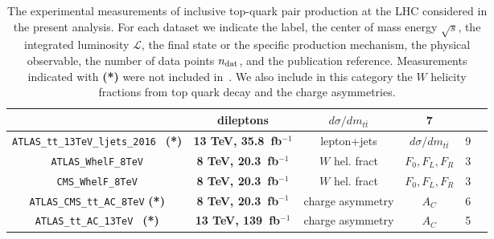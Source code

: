 \begin{table}[t]
\begin{tabular}{c|c|c|c|c|c}
      & dileptons
      & $d\sigma/dm_{t\bar{t}}$
      & 7
      & \cite{Sirunyan:2018ucr}  \\
    \midrule
      {\tt ATLAS\_tt\_13TeV\_ljets\_2016 } {\bf (*)}
      & {\bf 13 TeV, 35.8~fb$^{-1}$}
      & lepton+jets
      & $d\sigma/dm_{t\bar{t}}$
      & 9
      & \cite{Aad:2019ntk}  \\
   \midrule
\midrule
 {\tt ATLAS\_WhelF\_8TeV}  & {\bf 8 TeV, 20.3~fb$^{-1}$}  & $W$ hel. fract &
$F_0, F_L, F_R$  &  3  &  \cite{Aaboud:2016hsq}  \\
\midrule
{\tt CMS\_WhelF\_8TeV}  & {\bf 8 TeV, 20.3~fb$^{-1}$}  & $W$ hel. fract &
$F_0, F_L, F_R$  &  3  &  \cite{Khachatryan:2016fky}  \\
\midrule
\midrule
    {\tt ATLAS\_CMS\_tt\_AC\_8TeV}  {\bf(*)} & {\bf 8 TeV, 20.3~fb$^{-1}$} & charge asymmetry &
    $ A_C$ & 6 & \cite{Sirunyan:2017lvd}\\
\midrule   
    {\tt ATLAS\_tt\_AC\_13TeV
}  {\bf(*)} & {\bf 13 TeV, 139~fb$^{-1}$} & charge asymmetry &
    $ A_C$ & 5 & \cite{ATLAS:2019czt}\\
\bottomrule
  \end{tabular}
  \caption{\small The experimental measurements of inclusive top-quark pair 
    production at the LHC considered in the present analysis.
    For each dataset we indicate the label, 
    the center of mass energy $\sqrt{s}$, the
    integrated luminosity $\mathcal{L}$,
    the final state or the specific 
    production mechanism, the physical observable, the number of data 
    points $n_{\rm dat}$, and the publication reference.
    Measurements indicated with {\bf (*)} were not included 
    in~\cite{Hartland:2019bjb}.
    We also include in this category the $W$ helicity fractions
    from top quark decay and the charge asymmetries.
\label{eq:input_datasets}
}
\end{table}


